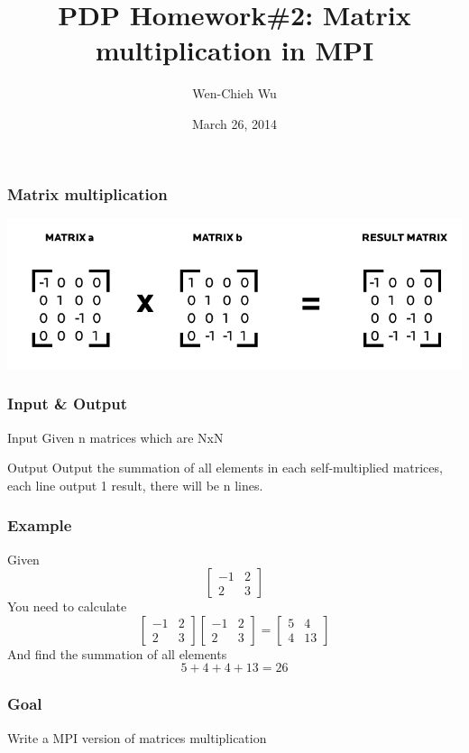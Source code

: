 \documentclass{beamer}
\title{PDP Homework\#2: Matrix multiplication in MPI}
\author{Wen-Chieh Wu}
\date{March 26, 2014}
\begin{document}
\maketitle
\begin{frame}
\frametitle{Matrix multiplication}
\begin{center}
  \includegraphics[scale=0.35]{img/img01.png}
\end{center}
\end{frame}

\begin{frame}
  \frametitle{Input \& Output}
  \begin{exampleblock}{Input}
    Given n matrices which are NxN
  \end{exampleblock}
  
  \begin{exampleblock}{Output}
    Output the summation of all elements in each self-multiplied matrices, each line output 1 result, there will be n lines.
  \end{exampleblock}
\end{frame}

\begin{frame}
\frametitle{Example}
Given
$$
\begin{bmatrix}
  -1 & 2\\
  2 & 3
\end{bmatrix}
$$
You need to calculate
$$
\begin{bmatrix}
  -1 & 2\\
  2 & 3
\end{bmatrix}
\begin{bmatrix}
  -1 & 2\\
  2 & 3
\end{bmatrix}
=
\begin{bmatrix}
  5 & 4\\
  4 & 13
\end{bmatrix}
$$
And find the summation of all elements
$$
5+4+4+13=26
$$
\end{frame}

\begin{frame}
  \frametitle{Goal}
  \begin{center}
    {\huge Write a MPI version of matrices multiplication}
  \end{center}
\end{frame}
\end{document}

